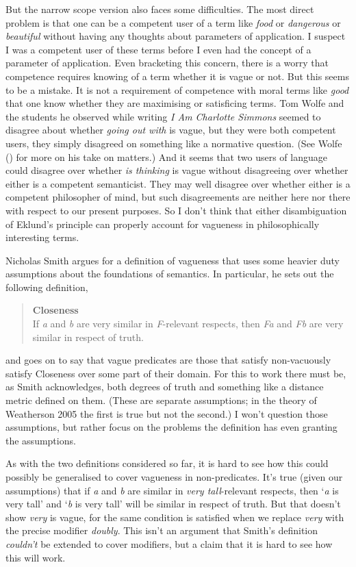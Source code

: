 \documentclass[
  11pt,
  letterpaper,
  DIV=11,
  numbers=noendperiod,
  twoside]{scrartcl}
\begin{document}
But the narrow scope version also faces some difficulties. The most
direct problem is that one can be a competent user of a term like
\emph{food} or \emph{dangerous} or \emph{beautiful} without having any
thoughts about parameters of application. I suspect I was a competent
user of these terms before I even had the concept of a parameter of
application. Even bracketing this concern, there is a worry that
competence requires knowing of a term whether it is vague or not. But
this seems to be a mistake. It is not a requirement of competence with
moral terms like \emph{good} that one know whether they are maximising
or satisficing terms. Tom Wolfe and the students he observed while
writing \emph{I Am Charlotte Simmons} seemed to disagree about whether
\emph{going out with} is vague, but they were both competent users, they
simply disagreed on something like a normative question. (See Wolfe
() for more on his take on matters.) And
it seems that two users of language could disagree over whether \emph{is
thinking} is vague without disagreeing over whether either is a
competent semanticist. They may well disagree over whether either is a
competent philosopher of mind, but such disagreements are neither here
nor there with respect to our present purposes. So I don't think that
either disambiguation of Eklund's principle can properly account for
vagueness in philosophically interesting terms.

Nicholas Smith argues for a definition of vagueness that uses some
heavier duty assumptions about the foundations of semantics. In
particular, he sets out the following definition,

\begin{quote}
\textbf{Closeness}\\
If \emph{a} and \emph{b} are very similar in \emph{F}-relevant respects,
then \emph{Fa} and \emph{Fb} are very similar in respect of truth.
\end{quote}

and goes on to say that vague predicates are those that satisfy
non-vacuously satisfy Closeness over some part of their domain. For this
to work there must be, as Smith acknowledges, both degrees of truth and
something like a distance metric defined on them. (These are separate
assumptions; in the theory of Weatherson 2005 the first is true but not
the second.) I won't question those assumptions, but rather focus on the
problems the definition has even granting the assumptions.

As with the two definitions considered so far, it is hard to see how
this could possibly be generalised to cover vagueness in non-predicates.
It's true (given our assumptions) that if \emph{a} and \emph{b} are
similar in \emph{very tall}-relevant respects, then `\emph{a} is very
tall' and `\emph{b} is very tall' will be similar in respect of truth.
But that doesn't show \emph{very} is vague, for the same condition is
satisfied when we replace \emph{very} with the precise modifier
\emph{doubly}. This isn't an argument that Smith's definition
\emph{couldn't} be extended to cover modifiers, but a claim that it is
hard to see how this will work.
\end{document}
